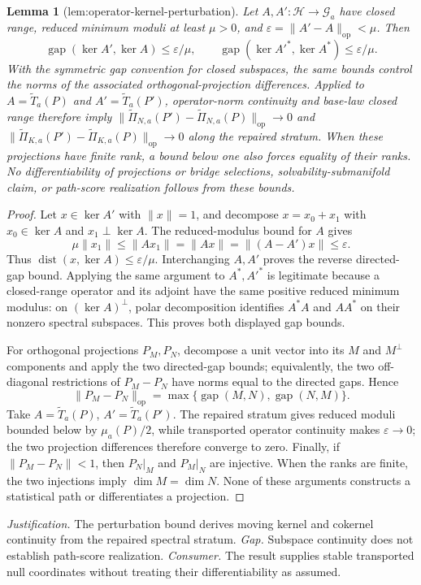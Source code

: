 \documentclass{article}
\newtheorem{lemma}{Lemma}
\begin{document}
\begin{lemma}[lem:operator-kernel-perturbation]\label{lem:operator-kernel-perturbation}
Let \(A,A':\mathcal H\to\mathcal G_a\) have closed range, reduced minimum moduli at least \(\mu>0\), and \(\varepsilon=\|A'-A\|_{\mathrm{op}}<\mu\). Then
\[
\operatorname{gap}(\ker A',\ker A)\le\varepsilon/\mu,\qquad
\operatorname{gap}(\ker A'^*,\ker A^*)\le\varepsilon/\mu.
\]
With the symmetric gap convention for closed subspaces, the same bounds control the norms of the associated orthogonal-projection differences. Applied to \(A=\widetilde T_a(P)\) and \(A'=\widetilde T_a(P')\), operator-norm continuity and base-law closed range therefore imply
\(\|\widetilde\Pi_{N,a}(P')-\widetilde\Pi_{N,a}(P)\|_{\mathrm{op}}\to0\) and
\(\|\widetilde\Pi_{K,a}(P')-\widetilde\Pi_{K,a}(P)\|_{\mathrm{op}}\to0\) along the repaired stratum. When these projections have finite rank, a bound below one also forces equality of their ranks. No differentiability of projections or bridge selections, solvability-submanifold claim, or path-score realization follows from these bounds.
\end{lemma}
\begin{proof}
Let \(x\in\ker A'\) with \(\|x\|=1\), and decompose \(x=x_0+x_1\) with \(x_0\in\ker A\) and \(x_1\perp\ker A\).  The reduced-modulus bound for \(A\) gives
\[
\mu\|x_1\|\le\|Ax_1\|=\|Ax\|=\|(A-A')x\|\le\varepsilon.
\]
Thus \(\operatorname{dist}(x,\ker A)\le\varepsilon/\mu\).  Interchanging \(A,A'\) proves the reverse directed-gap bound.  Applying the same argument to \(A^*,A'^*\) is legitimate because a closed-range operator and its adjoint have the same positive reduced minimum modulus: on \((\ker A)^{\perp}\), polar decomposition identifies \(A^*A\) and \(AA^*\) on their nonzero spectral subspaces.  This proves both displayed gap bounds.

For orthogonal projections \(P_M,P_N\), decompose a unit vector into its \(M\) and \(M^\perp\) components and apply the two directed-gap bounds; equivalently, the two off-diagonal restrictions of \(P_M-P_N\) have norms equal to the directed gaps.  Hence
\[
\|P_M-P_N\|_{\mathrm{op}}
=\max\{\operatorname{gap}(M,N),\operatorname{gap}(N,M)\}.
\]
Take \(A=\widetilde T_a(P)\), \(A'=\widetilde T_a(P')\).  The repaired stratum gives reduced moduli bounded below by \(\mu_a(P)/2\), while transported operator continuity makes \(\varepsilon\to0\); the two projection differences therefore converge to zero.  Finally, if \(\|P_M-P_N\|<1\), then \(P_N|_M\) and \(P_M|_N\) are injective.  When the ranks are finite, the two injections imply \(\dim M=\dim N\).  None of these arguments constructs a statistical path or differentiates a projection.
\end{proof}
\par\smallskip\noindent \textit{Justification.} The perturbation bound derives moving kernel and cokernel continuity from the repaired spectral stratum. \textit{Gap.} Subspace continuity does not establish path-score realization. \textit{Consumer.} The result supplies stable transported null coordinates without treating their differentiability as assumed.
\end{document}
